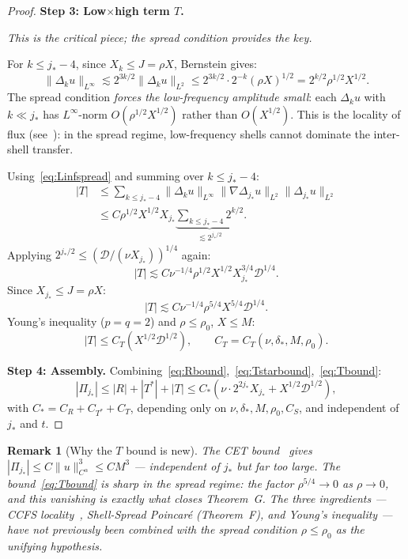 \documentclass[11pt]{article}
\newtheorem*{remark}{Remark}
\newcommand{\norm}[2]{\|{#1}\|_{#2}}
\newcommand{\DD}{\mathcal{D}}
\begin{document}
\begin{proof}
\medskip\noindent\textbf{Step 3: Low$\times$high term $T$.}

\emph{This is the critical piece; the spread condition provides the key.}

For $k \le j_*-4$, since $X_k \le J = \rho X$, Bernstein gives:
\begin{equation}\label{eq:Linfspread}
  \norm{\Delta_k u}{L^\infty}
  \lesssim 2^{3k/2}\norm{\Delta_k u}{L^2}
  \le 2^{3k/2}\cdot 2^{-k}(\rho X)^{1/2}
  = 2^{k/2}\rho^{1/2}X^{1/2}.
\end{equation}
The spread condition \emph{forces the low-frequency amplitude small}:
each $\Delta_k u$ with $k \ll j_*$ has $L^\infty$-norm
$O(\rho^{1/2}X^{1/2})$ rather than $O(X^{1/2})$.
This is the locality of flux (see~\cite{CCFS2007}): in the spread
regime, low-frequency shells cannot dominate the inter-shell transfer.

Using~\eqref{eq:Linfspread} and summing over $k \le j_*-4$:
\begin{align*}
  |T|
  &\le \sum_{k\le j_*-4}
    \norm{\Delta_k u}{L^\infty}
    \norm{\nabla \Delta_{j_*} u}{L^2}
    \norm{\Delta_{j_*} u}{L^2}\\
  &\le C\rho^{1/2}X^{1/2} X_{j_*}
    \underbrace{\sum_{k\le j_*-4}2^{k/2}}_{\lesssim 2^{j_*/2}}.
\end{align*}
Applying $2^{j_*/2} \le (\DD/(\nu X_{j_*}))^{1/4}$ again:
\[
  |T| \lesssim
  C\nu^{-1/4}\rho^{1/2}X^{1/2}X_{j_*}^{3/4}\DD^{1/4}.
\]
Since $X_{j_*} \le J = \rho X$:
\[
  |T| \lesssim
  C\nu^{-1/4}\rho^{5/4}X^{5/4}\DD^{1/4}.
\]
Young's inequality ($p=q=2$) and $\rho \le \rho_0$, $X \le M$:
\begin{equation}\label{eq:Tbound}
  |T| \le C_T\!\left(X^{1/2}\DD^{1/2}\right),
  \qquad C_T = C_T(\nu, \delta_*, M, \rho_0).
\end{equation}

\medskip\noindent\textbf{Step 4: Assembly.}
Combining~\eqref{eq:Rbound},~\eqref{eq:Tstarbound},~\eqref{eq:Tbound}:
\[
  |\Pi_{j_*}| \le |R| + |T^*| + |T|
  \le C_*\!\left(\nu \cdot 2^{2j_*} X_{j_*} + X^{1/2}\DD^{1/2}\right),
\]
with $C_* = C_R + C_{T^*} + C_T$,
depending only on $\nu, \delta_*, M, \rho_0, C_S$,
and independent of $j_*$ and $t$.
\end{proof}

\begin{remark}[Why the $T$ bound is new]
The CET bound~\cite{CET1994} gives $|\Pi_{j_*}| \le C\norm{u}{C^\alpha}^3
\le CM^3$ --- independent of $j_*$ but far too large.
The bound~\eqref{eq:Tbound} is sharp in the spread regime:
the factor $\rho^{5/4} \to 0$ as $\rho \to 0$, and this
vanishing is exactly what closes Theorem~G.
The three ingredients --- CCFS locality~\cite{CCFS2007},
Shell-Spread Poincar\'e (Theorem~F), and Young's inequality ---
have not previously been combined with the spread condition
$\rho \le \rho_0$ as the unifying hypothesis.
\end{remark}
\end{document}

